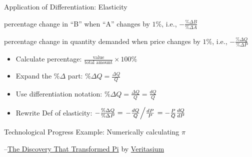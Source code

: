 \documentclass{beamer}
\begin{document}
\begin{frame}[t]{Application of Differentiation: Elasticity}
    \begin{definition}
	percentage change in ``B'' when ``A'' changes by $1\%$, i.e., $-\frac{\%  \Delta B}{\%  \Delta A} $
    \end{definition}
    \begin{definition}
	percentage change in quantity demanded when price changes by $1\%$, i.e., $-\frac{\%  \Delta Q}{\%  \Delta P} $
    \end{definition}
    \begin{itemize}
	\item Calculate percentage: $\frac{\text{value}}{\text{total amount}}  \times 100 \% $
        \item Expand the $\%  \Delta $ part: $\% \Delta Q = \frac{ \Delta Q}{Q} $
	\item Use differentiation notation: $\% \Delta Q = \frac{ \Delta Q}{Q} = \frac{d Q}{Q}  $
	\item Rewrite Def of elasticity: $-\frac{\%  \Delta Q}{\%  \Delta P} = \left. - \frac{dQ}{Q} \middle/ \frac{dP}{P} \right.  = -\frac{P}{Q} \frac{dQ}{dP} $
    \end{itemize}
\end{frame}

\begin{frame}[standout]{Technological Progress Example: Numerically calculating $ \pi  $}
\label{slide:Example_of_Technological_Progress__Numerically_calculating____pi___}

    --\href{https://www.youtube.com/watch?v=gMlf1ELvRzc}{The Discovery That Transformed Pi} by \href{https://www.youtube.com/channel/UCHnyfMqiRRG1u-2MsSQLbXA}{Veritasium }

\end{frame}
\end{document}
